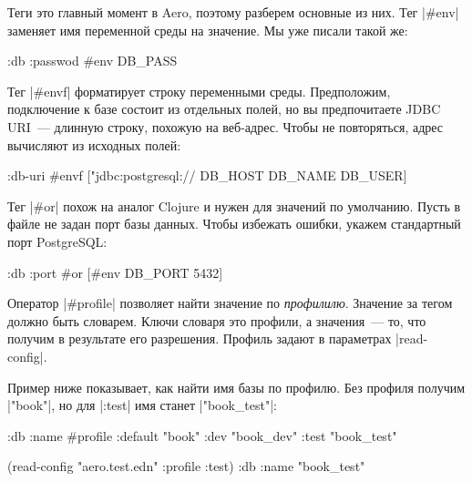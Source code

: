 Теги это главный момент в Aero, поэтому разберем основные из них. Тег
\spverb|#env| заменяет имя переменной среды на значение. Мы уже писали такой
же:

\begin{english}
  \begin{clojure}
{:db {:passwod #env DB_PASS}}
  \end{clojure}
\end{english}

Тег \spverb|#envf| форматирует строку переменными среды. Предположим,
подключение к базе состоит из отдельных полей, но вы предпочитаете JDBC URI~---
длинную строку, похожую на веб-адрес. Чтобы не повторяться, адрес вычисляют из
исходных полей:

\begin{english}
  \begin{clojure}
{:db-uri #envf ["jdbc:postgresql://%
                DB_HOST DB_NAME DB_USER]}
  \end{clojure}
\end{english}

Тег \spverb|#or| похож на аналог Clojure и нужен для значений по
умолчанию. Пусть в файле не задан порт базы данных. Чтобы избежать ошибки,
укажем стандартный порт PostgreSQL:

\begin{english}
  \begin{clojure}
{:db {:port #or [#env DB_PORT 5432]}}
  \end{clojure}
\end{english}


Оператор \spverb|#profile| позволяет найти значение по
\emph{профилилю}. Значение за тегом должно быть словарем. Ключи словаря это
профили, а значения~--- то, что получим в результате его разрешения. Профиль
задают в параметрах \spverb|read-config|.

Пример ниже показывает, как найти имя базы по профилю. Без профиля получим
\spverb|"book"|, но для \spverb|:test| имя станет \spverb|"book_test"|:

\begin{english}
  \begin{clojure}
{:db {:name #profile {:default "book"
                      :dev     "book_dev"
                      :test    "book_test"}}}

(read-config "aero.test.edn" {:profile :test})
{:db {:name "book_test"}}
  \end{clojure}
\end{english}

